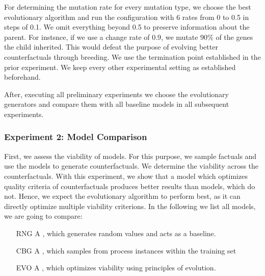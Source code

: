 \documentclass[./../../paper.tex]{subfiles}
\begin{document}

For determining the mutation rate for every mutation type, we choose the best evolutionary algorithm and run the configuration with 6 rates from 0 to 0.5 in steps of 0.1. We omit everything beyond 0.5 to preserve information about the parent. For instsnce, if we use a change rate of 0.9, we mutate 90\% of the genes the child inherited. This would defeat the purpose of evolving better counterfactuals through breeding. We use the termination point established in the prior experiment. We keep every other experimental setting as established beforehand. 

After, executing all preliminary experiments we choose the evolutionary generators and compare them with all baseline models in all subsequent experiments.






\subsubsection{Experiment 2: Model Comparison}
First, we assess the viability of  models. For this purpose, we sample  factuals and use the models to generate  counterfactuals. We determine the  viability across the counterfactuals. With this experiment, we show that a model which optimizes quality criteria of counterfactuals produces better results than models, which do not. Hence, we expect the evolutionary algorithm to perform best, as it can directly optimize multiple viability criterions. In the following we list all models, we are going to compare:

\begin{enumerate}
    \item[RNG] A \ModelRNG, which generates random values and acts as a baseline. 
    \item[CBG] A \ModelCBG, which samples from process instances within the training set
    \item[EVO] A \ModelEVOFSR, which optimizes viability using principles of evolution.
\end{enumerate}
\end{document}
